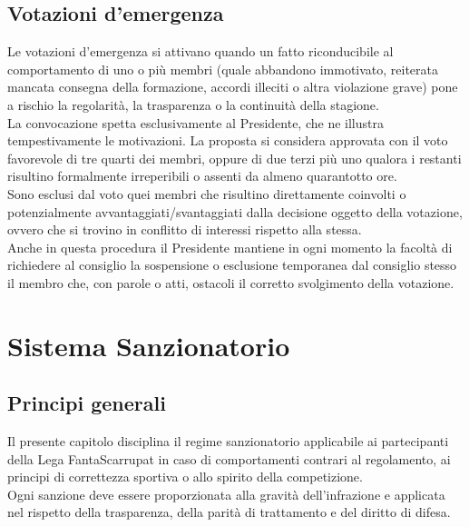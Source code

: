 \section{Votazioni d'emergenza}
\label{art:2.3}

Le votazioni d'emergenza si attivano quando un fatto riconducibile al comportamento di uno o più membri (quale abbandono immotivato, reiterata mancata consegna della formazione, accordi illeciti o altra violazione grave) pone a rischio la regolarità, la trasparenza o la continuità della stagione.\\

La convocazione spetta esclusivamente al Presidente, che ne illustra tempestivamente le motivazioni. La proposta si considera approvata con il voto favorevole di tre quarti dei membri, oppure di due terzi più uno qualora i restanti risultino formalmente irreperibili o assenti da almeno quarantotto ore.\\

Sono esclusi dal voto quei membri che risultino direttamente coinvolti o potenzialmente avvantaggiati/svantaggiati dalla decisione oggetto della votazione, ovvero che si trovino in conflitto di interessi rispetto alla stessa.\\

Anche in questa procedura il Presidente mantiene in ogni momento la facoltà di richiedere al consiglio la sospensione o esclusione temporanea dal consiglio stesso il membro che, con parole o atti, ostacoli il corretto svolgimento della votazione.


\chapter{Sistema Sanzionatorio}
\label{cap:sistema-sanzionatorio}

\section{Principi generali}
\label{art:3.1}

Il presente capitolo disciplina il regime sanzionatorio applicabile ai partecipanti della Lega FantaScarrupat in caso di comportamenti contrari al regolamento, ai principi di correttezza sportiva o allo spirito della competizione.\\
Ogni sanzione deve essere proporzionata alla gravità dell'infrazione e applicata nel rispetto della trasparenza, della parità di trattamento e del diritto di difesa.

